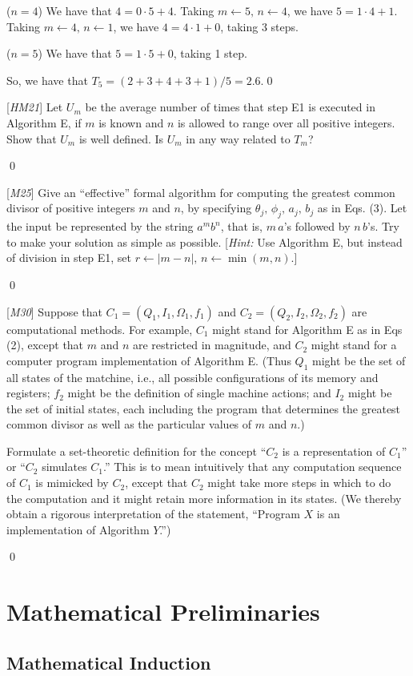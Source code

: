 ($n = 4$) We have that $4 = 0\cdot 5 + 4$. Taking $m \leftarrow 5, \, n \leftarrow 4$, we have $5 = 1\cdot 4 + 1$. Taking $m \leftarrow 4, \, n \leftarrow 1$, we have $4 = 4\cdot 1 + 0$, taking 3 steps.

($n=5$) We have that $5 = 1\cdot 5 + 0$, taking 1 step.

So, we have that $T_5 = (2 + 3 + 4 + 3 + 1) / 5 = 2.6$.\qed



 [\textit{HM21}] Let $U_m$ be the average number of times that step E1 is executed in Algorithm E, if $m$ is known and $n$ is allowed to range over all positive integers. Show that $U_m$ is well defined. Is $U_m$ in any way related to $T_m$?

\sol \qed

 [\textit{M25}] Give an ``effective'' formal algorithm for computing the greatest common divisor of positive integers $m$ and $n$, by specifying $\theta_j, \, \phi_j, \, a_j, \, b_j$ as in Eqs. (3). Let the input be represented by the string $a^mb^n$, that is, $m \, a$'s followed by $n \, b$'s. Try to make your solution as simple as possible. [\textit{Hint:} Use Algorithm E, but instead of division in step E1, set $r \leftarrow |m - n|, \, n \leftarrow \min(m, n)$.]

\sol \qed

 [\textit{M30}] Suppose that $C_1 = (Q_1, I_1, \Omega_1, f_1)$ and $C_2 = (Q_2, I_2, \Omega_2, f_2)$ are computational methods. For example, $C_1$ might stand for Algorithm E as in Eqs (2), except that $m$ and $n$ are restricted in magnitude, and $C_2$ might stand for a computer program implementation of Algorithm E. (Thus $Q_1$ might be the set of all states of the matchine, i.e., all possible configurations of its memory and registers; $f_2$ might be the definition of single machine actions; and $I_2$ might be the set of initial states, each including the program that determines the greatest common divisor as well as the particular values of $m$ and $n$.)

Formulate a set-theoretic definition for the concept ``$C_2$ is a representation of $C_1$'' or ``$C_2$ simulates $C_1$.'' This is to mean intuitively that any computation sequence of $C_1$ is mimicked by $C_2$, except that $C_2$ might take more steps in which to do the computation and it might retain more information in its states. (We thereby obtain a rigorous interpretation of the statement, ``Program $X$ is an implementation of Algorithm $Y$.'')

\sol \qed

\section{Mathematical Preliminaries}
\subsection{Mathematical Induction}